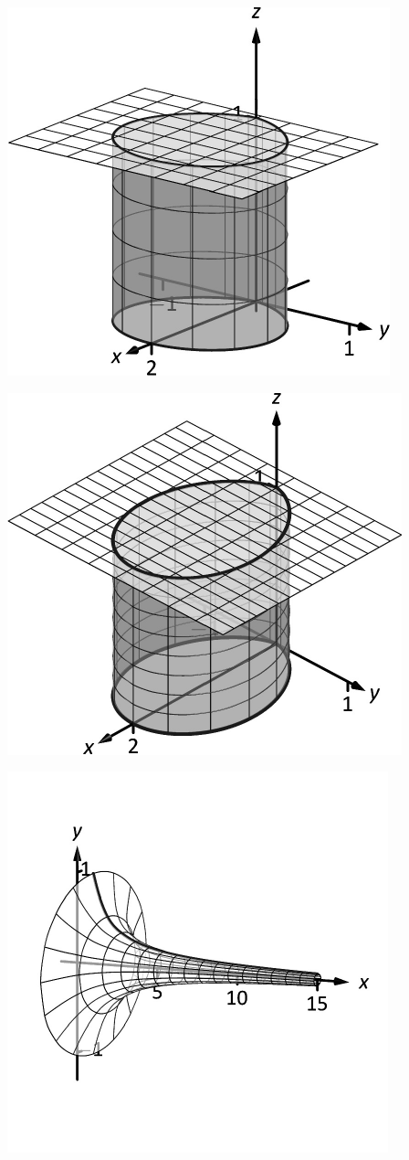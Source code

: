 \documentclass[10pt]{article}
\begin{document}
\includegraphics{figdouble_summary_3DBW.pdf}
\texttt{}

\includegraphics{figdoublesummary_3DBW.pdf}
\texttt{}

\includegraphics{figgabriel_3DBW.pdf}
\texttt{}
\end{document}
